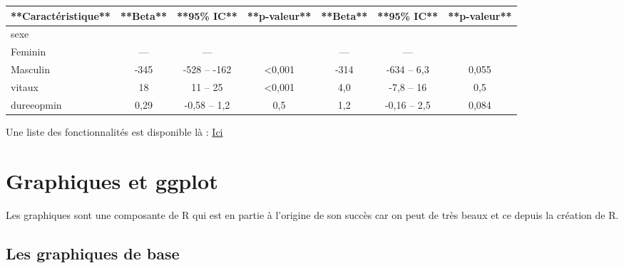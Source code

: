 \documentclass[
]{book}
\newenvironment{Shaded}{\begin{snugshade}}{\end{snugshade}}
\newcommand{\AttributeTok}[1]{\textcolor[rgb]{0.13,0.29,0.53}{#1}}
\newcommand{\FunctionTok}[1]{\textcolor[rgb]{0.13,0.29,0.53}{\textbf{#1}}}
\newcommand{\NormalTok}[1]{#1}
\newcommand{\SpecialCharTok}[1]{\textcolor[rgb]{0.81,0.36,0.00}{\textbf{#1}}}
\newcommand{\StringTok}[1]{\textcolor[rgb]{0.31,0.60,0.02}{#1}}
\begin{document}
\begin{Shaded}
\end{Shaded}

\begin{tabular}{l|c|c|c|c|c|c}
\hline
**Caractéristique** & **Beta** & **95\% IC** & **p-valeur** & **Beta** & **95\% IC** & **p-valeur**\\
\hline
sexe &  &  &  &  &  & \\
\hline
Feminin & — & — &  & — & — & \\
\hline
Masculin & -345 & -528 – -162 & <0,001 & -314 & -634 – 6,3 & 0,055\\
\hline
vitaux & 18 & 11 – 25 & <0,001 & 4,0 & -7,8 – 16 & 0,5\\
\hline
dureeopmin & 0,29 & -0,58 – 1,2 & 0,5 & 1,2 & -0,16 – 2,5 & 0,084\\
\hline
\end{tabular}

Une liste des fonctionnalités est disponible là :
\href{https://www.danieldsjoberg.com/gtsummary/reference/theme_gtsummary.html\#examples}{Ici}

\hypertarget{graphiques-et-ggplot}{%
\chapter{Graphiques et ggplot}\label{graphiques-et-ggplot}}

Les graphiques sont une composante de R qui est en partie à l'origine de son
succès car on peut de très beaux et ce depuis la création de R.

\hypertarget{les-graphiques-de-base}{%
\section{Les graphiques de base}\label{les-graphiques-de-base}}
\end{document}
